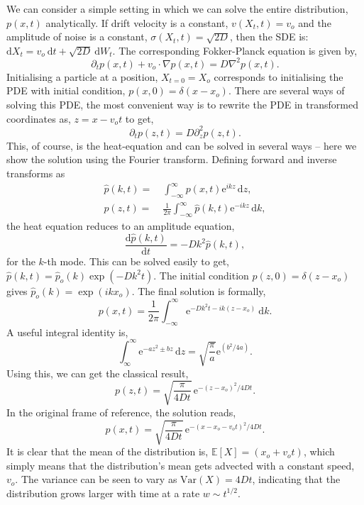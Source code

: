 \documentclass[12pt]{article}
\def\d{\mathrm{d}}
\def\e{\mathrm{e}}
\def\hp{\hat{p}}
\def\E{\mathbb{E}}
\def\var{\mathrm{Var}}
\def\grad{\nabla}
\begin{document}
\begin{singlespace}
We can consider a simple setting in which we can solve the entire distribution, $p(x, t)$ analytically. If drift velocity is a constant, $v(X_t, t) = v_o$ and the amplitude of noise is a constant, $\sigma(X_t, t) = \sqrt{2D}$, then the SDE is: $\d X_t = v_o \ \d t + \sqrt{2D}\ \d W_t$. The corresponding Fokker-Planck equation is given by,
\begin{equation}
    \partial_t p(x, t) + v_o \cdot \grad p(x, t) = D\grad^2 p(x, t).
    \label{eq:OUFPP}
\end{equation}
Initialising a particle at a position, $X_{t=0} = X_o$ corresponds to initialising the PDE with initial condition, $p(x, 0) = \delta(x-x_o)$. There are several ways of solving this PDE, the most convenient way is to rewrite the PDE in transformed coordinates as, $z = x - v_o t$ to get,
\[
\partial_t p(z, t) = D \partial_z^2 p(z, t).
\]
This, of course, is the heat-equation and can be solved in several ways -- here we show the solution using the Fourier transform. Defining forward and inverse transforms as
\begin{align}
    \hp(k, t) =&\ \int_{-\infty}^{\infty} p(x, t) \e^{ikz}\,\d z,\\
    p(z, t) =&\ \frac{1}{2\pi} \int_{-\infty}^{\infty} \hp(k, t) \e^{-ikz}\,\d k,
\end{align}
the heat equation reduces to an amplitude equation,
\[
\frac{\d \hp(k, t)}{\d t} = -D k^2 \hp(k, t),
\]
for the $k$-th mode. This can be solved easily to get, $\hp(k, t) = \hp_o(k) \exp(-Dk^2t)$. The initial condition $p(z, 0) = \delta(z-x_o)$ gives $\hp_o(k) = \exp(ikx_o)$. The final solution is formally,
\[
p(x, t) =  \frac{1}{2\pi} \int_{-\infty}^{\infty} \e^{-Dk^2 t - ik(z-x_o)} \ \d k.
\]
A useful integral identity is,
\[
\int_\infty^\infty \e^{-a z^2 \pm b z}\,\d z = \sqrt{\frac{\pi}{a}} \e^{(b^2/4a)}.
\]
Using this, we can get the classical result,
\begin{equation}
p(z, t) = \sqrt{\frac{\pi}{4Dt}}\, \e^{-(z - x_o)^2/4 D t}.
\label{eq:heatSoln}
\end{equation}
In the original frame of reference, the solution reads,
\[
p(x, t) = \sqrt{\frac{\pi}{4Dt}}\, \e^{-(x - x_o - v_o t)^2/4 D t}.
\]
It is clear that the mean of the distribution is, $\E[X] = (x_o+v_o t)$, which simply means that the distribution's mean gets advected with a constant speed, $v_o$. The variance can be seen to vary as $\var(X) = 4Dt$, indicating that the distribution grows larger with time at a rate $w \sim t^{1/2}$.


\end{singlespace}
\end{document}
